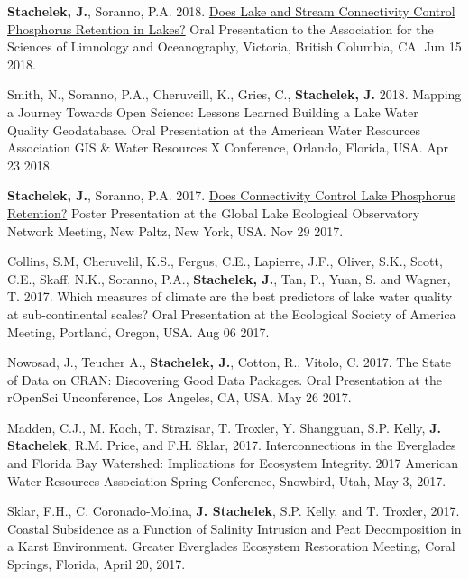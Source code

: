 \documentclass[11pt]{article}
\makeatletter
\newlength{\bibhang}
\newlength{\bibsep}
 {\@listi \global\bibsep\itemsep \global\advance\bibsep by\parsep}
\newenvironment{bibenum*}
  {\renewcommand\labelenumi{[\theenumi]}%
   \etaremune[
     topsep=0pt,
     itemsep=\bibsep,
     parsep=0pt,partopsep=0pt,
     itemindent=-\bibhang,
     leftmargin=0.8em
     ]
     }
  {\endetaremune}
\makeatother
\begin{document}
\begin{bibenum*}
    \item \textbf{Stachelek, J.}, Soranno, P.A. 2018. \href{https://doi.org/10.6084/m9.figshare.5903875.v2}{Does Lake and Stream Connectivity Control Phosphorus Retention in Lakes?} Oral Presentation to the Association for the Sciences of Limnology and Oceanography, Victoria, British Columbia, CA. Jun 15 2018.

    \item Smith, N., Soranno, P.A., Cheruveill, K., Gries, C., \textbf{Stachelek, J.} 2018. Mapping a Journey Towards Open Science: Lessons Learned Building a Lake Water Quality Geodatabase. Oral Presentation at the American Water Resources Association GIS \& Water Resources X Conference, Orlando, Florida, USA. Apr 23 2018.

    \item \textbf{Stachelek, J.}, Soranno, P.A. 2017. \href{https://doi.org/10.6084/m9.figshare.9638735.v1}{Does Connectivity Control Lake Phosphorus Retention?} Poster Presentation at the Global Lake Ecological Observatory Network Meeting, New Paltz, New York, USA. Nov 29 2017.

    \item Collins, S.M, Cheruvelil, K.S., Fergus, C.E., Lapierre, J.F., Oliver, S.K., Scott, C.E., Skaff, N.K., Soranno, P.A., \textbf{Stachelek, J.}, Tan, P., Yuan, S. and Wagner, T. 2017. Which measures of climate are the best predictors of lake water quality at sub-continental scales? Oral Presentation at the Ecological Society of America Meeting, Portland, Oregon, USA. Aug 06 2017.

    \item Nowosad, J., Teucher A., \textbf{Stachelek, J.}, Cotton, R., Vitolo, C. 2017. The State of Data on CRAN: Discovering Good Data Packages. Oral Presentation at the rOpenSci Unconference, Los Angeles, CA, USA. May 26 2017.

    \item Madden, C.J., M. Koch, T. Strazisar, T. Troxler, Y. Shangguan, S.P. Kelly, \textbf{J. Stachelek}, R.M. Price, and F.H. Sklar, 2017. Interconnections in the Everglades and Florida Bay Watershed: Implications for Ecosystem Integrity. 2017 American Water Resources Association Spring Conference, Snowbird, Utah, May 3, 2017.

    \item Sklar, F.H., C. Coronado-Molina, \textbf{J. Stachelek}, S.P. Kelly, and T. Troxler, 2017. Coastal Subsidence as a Function of Salinity Intrusion and Peat Decomposition in a Karst Environment. Greater Everglades Ecosystem Restoration Meeting, Coral Springs, Florida, April 20, 2017.


\end{bibenum*}
\end{document}
